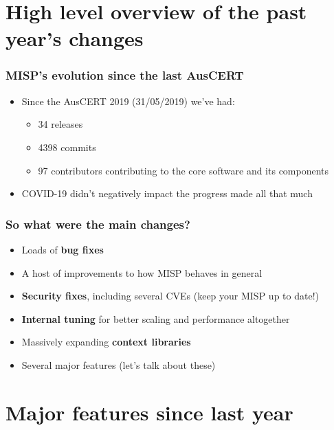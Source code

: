\section{High level overview of the past year's changes}

\begin{frame}
  \frametitle{MISP's evolution since the last AusCERT}
  \begin{itemize}
    \item Since the AusCERT 2019 (31/05/2019) we've had:
    \begin{itemize}
        \item 34 releases
        \item 4398 commits
        \item 97 contributors contributing to the core software and its components
    \end{itemize}
    \item COVID-19 didn't negatively impact the progress made all that much
  \end{itemize}
\end{frame}

\begin{frame}
  \frametitle{So what were the main changes?}
  \begin{itemize}
     \item Loads of {\bf bug fixes}
     \item A host of improvements to how MISP behaves in general
     \item {\bf Security fixes}, including several CVEs (keep your MISP up to date!)
     \item {\bf Internal tuning} for better scaling and performance altogether
     \item Massively expanding {\bf context libraries}
     \item Several major features (let's talk about these)
  \end{itemize}
\end{frame}

\section{Major features since last year}

